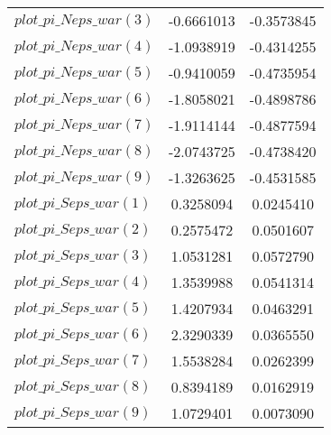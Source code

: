 \begin{center}
\begin{longtable}{lcc}
$plot\_pi\_N eps\_war (3)   $	 & 	     -0.6661013	 & 	     -0.3573845 \\ 
$plot\_pi\_N eps\_war (4)   $	 & 	     -1.0938919	 & 	     -0.4314255 \\ 
$plot\_pi\_N eps\_war (5)   $	 & 	     -0.9410059	 & 	     -0.4735954 \\ 
$plot\_pi\_N eps\_war (6)   $	 & 	     -1.8058021	 & 	     -0.4898786 \\ 
$plot\_pi\_N eps\_war (7)   $	 & 	     -1.9114144	 & 	     -0.4877594 \\ 
$plot\_pi\_N eps\_war (8)   $	 & 	     -2.0743725	 & 	     -0.4738420 \\ 
$plot\_pi\_N eps\_war (9)   $	 & 	     -1.3263625	 & 	     -0.4531585 \\ 
$plot\_pi\_S eps\_war (1)   $	 & 	      0.3258094	 & 	      0.0245410 \\ 
$plot\_pi\_S eps\_war (2)   $	 & 	      0.2575472	 & 	      0.0501607 \\ 
$plot\_pi\_S eps\_war (3)   $	 & 	      1.0531281	 & 	      0.0572790 \\ 
$plot\_pi\_S eps\_war (4)   $	 & 	      1.3539988	 & 	      0.0541314 \\ 
$plot\_pi\_S eps\_war (5)   $	 & 	      1.4207934	 & 	      0.0463291 \\ 
$plot\_pi\_S eps\_war (6)   $	 & 	      2.3290339	 & 	      0.0365550 \\ 
$plot\_pi\_S eps\_war (7)   $	 & 	      1.5538284	 & 	      0.0262399 \\ 
$plot\_pi\_S eps\_war (8)   $	 & 	      0.8394189	 & 	      0.0162919 \\ 
$plot\_pi\_S eps\_war (9)   $	 & 	      1.0729401	 & 	      0.0073090 \\ 
\end{longtable}
 \end{center}
